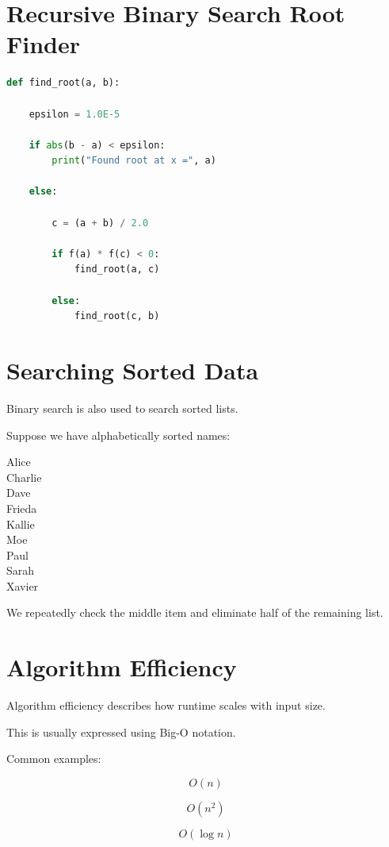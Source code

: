 \documentclass[11pt]{article}
\begin{document}
\section{Recursive Binary Search Root Finder}

\begin{lstlisting}[language=Python]
def find_root(a, b):

    epsilon = 1.0E-5

    if abs(b - a) < epsilon:
        print("Found root at x =", a)

    else:

        c = (a + b) / 2.0

        if f(a) * f(c) < 0:
            find_root(a, c)

        else:
            find_root(c, b)
\end{lstlisting}

\section{Searching Sorted Data}

Binary search is also used to search sorted lists.

Suppose we have alphabetically sorted names:

\begin{center}
Alice \\
Charlie \\
Dave \\
Frieda \\
Kallie \\
Moe \\
Paul \\
Sarah \\
Xavier
\end{center}

We repeatedly check the middle item and eliminate half of the remaining list.

\section{Algorithm Efficiency}

Algorithm efficiency describes how runtime scales with input size.

This is usually expressed using Big-O notation.

Common examples:

\[
O(n)
\]

\[
O(n^2)
\]

\[
O(\log n)
\]
\end{document}
